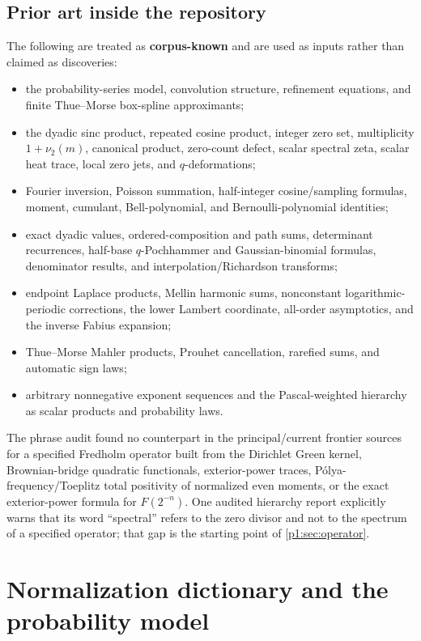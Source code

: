 \documentclass[11pt,oneside]{article}
\theoremstyle{definition}
\newcommand{\vtwo}{\nu_2}
\newcommand{\CorpusKnown}{\textcolor{linkblue}{\textbf{corpus-known}}}
\begin{document}
\subsection{Prior art inside the repository}

The following are treated as \CorpusKnown{} and are used as inputs rather than claimed
as discoveries:
\begin{itemize}[leftmargin=2em]
\item the probability-series model, convolution structure, refinement equations, and
      finite Thue--Morse box-spline approximants;
\item the dyadic sinc product, repeated cosine product, integer zero set, multiplicity
      \(1+\vtwo(m)\), canonical product, zero-count defect, scalar spectral zeta,
      scalar heat trace, local zero jets, and \(q\)-deformations;
\item Fourier inversion, Poisson summation, half-integer cosine/sampling formulas,
      moment, cumulant, Bell-polynomial, and Bernoulli-polynomial identities;
\item exact dyadic values, ordered-composition and path sums, determinant recurrences,
      half-base \(q\)-Pochhammer and Gaussian-binomial formulas, denominator results,
      and interpolation/Richardson transforms;
\item endpoint Laplace products, Mellin harmonic sums, nonconstant logarithmic-periodic
      corrections, the lower Lambert coordinate, all-order asymptotics, and the inverse
      Fabius expansion;
\item Thue--Morse Mahler products, Prouhet cancellation, rarefied sums, and automatic
      sign laws;
\item arbitrary nonnegative exponent sequences and the Pascal-weighted hierarchy as
      scalar products and probability laws.
\end{itemize}

The phrase audit found no counterpart in the principal/current frontier sources for a
specified Fredholm operator built from the Dirichlet Green kernel, Brownian-bridge
quadratic functionals, exterior-power traces, P\'olya-frequency/Toeplitz total
positivity of normalized even moments, or the exact exterior-power formula for
\(F(2^{-n})\).  One audited hierarchy report explicitly warns that its word
``spectral'' refers to the zero divisor and not to the spectrum of a specified operator;
that gap is the starting point of \cref{p1:sec:operator}.

\section{Normalization dictionary and the probability model}
\label{p1:sec:normalization}
\end{document}

